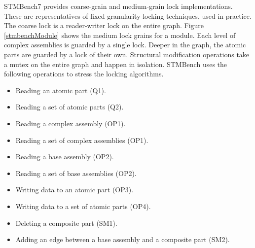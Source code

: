 STMBench7 provides coarse-grain and medium-grain lock implementations. These are representatives of fixed granularity locking techniques, used in practice.  
The coarse lock is a reader-writer lock on the entire graph. 
Figure  \ref{stmbenchModule} shows the medium lock grains for a module. 
Each level of complex assemblies is guarded by a single lock. 
Deeper in the graph, the atomic parts are guarded by a lock of their own.
Structural modification operations take a mutex on the entire graph and happen in isolation.
STMBench uses the following operations to stress the locking algorithms.
\begin{itemize}
	\item Reading an atomic part (Q1).
	\item Reading a set of atomic parts (Q2).
	\item Reading a complex assembly (OP1).
	\item Reading a set of complex assemblies (OP1).
	\item Reading a base assembly (OP2).
	\item Reading a set of base assemblies (OP2).
	\item Writing data to an atomic part (OP3).
	\item Writing data to a set of atomic parts (OP4).
	\item Deleting a composite part (SM1).
	\item Adding an edge between a base assembly and a composite part (SM2).
\end{itemize}


